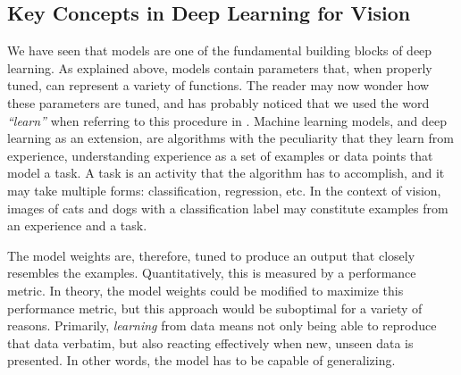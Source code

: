 \subsection{Key Concepts in Deep Learning for Vision}
We have seen that models are one of the fundamental building blocks of deep learning. As explained above, models contain parameters that, when properly tuned, can represent a variety of functions. The reader may now wonder how these parameters are tuned, and has probably noticed that we used the word \textit{``learn''} when referring to this procedure in . Machine learning models, and deep learning as an extension, are algorithms with the peculiarity that they learn from experience, understanding experience as a set of examples or data points that model a task. A task is an activity that the algorithm has to accomplish, and it may take multiple forms: classification, regression, etc. In the context of vision, images of cats and dogs with a classification label may constitute examples from an experience and a task.

The model weights are, therefore, tuned to produce an output that closely resembles the examples. Quantitatively, this is measured by a performance metric. In theory, the model weights could be modified to maximize this performance metric, but this approach would be suboptimal for a variety of reasons. Primarily, \textit{learning} from data means not only being able to reproduce that data verbatim, but also reacting effectively when new, unseen data is presented. In other words, the model has to be capable of generalizing.

